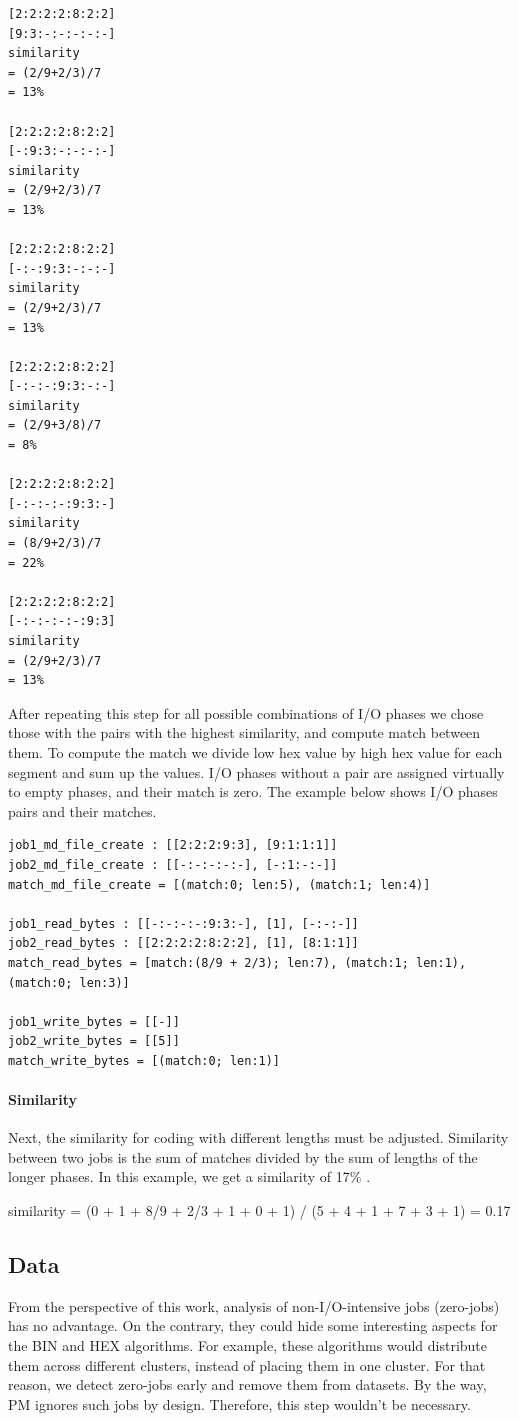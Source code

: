 \documentclass[]{llncs}
\begin{document}
\begin{lstlisting}
[2:2:2:2:8:2:2]
[9:3:-:-:-:-:-]
similarity 
= (2/9+2/3)/7 
= 13%

[2:2:2:2:8:2:2]
[-:9:3:-:-:-:-]
similarity 
= (2/9+2/3)/7 
= 13%

[2:2:2:2:8:2:2]
[-:-:9:3:-:-:-]
similarity 
= (2/9+2/3)/7 
= 13%

[2:2:2:2:8:2:2]
[-:-:-:9:3:-:-]
similarity 
= (2/9+3/8)/7
= 8%

[2:2:2:2:8:2:2]
[-:-:-:-:9:3:-]
similarity
= (8/9+2/3)/7
= 22%

[2:2:2:2:8:2:2]
[-:-:-:-:-:9:3]
similarity 
= (2/9+2/3)/7 
= 13%
\end{lstlisting}


After repeating this step for all possible combinations of I/O phases we chose those with the pairs with the highest similarity, and compute match between them.
To compute the match we divide low hex value by high hex value for each segment and sum up the values.
I/O phases without a pair are assigned virtually to empty phases, and their match is zero.
The example below shows I/O phases pairs and their matches.

\begin{lstlisting}
job1_md_file_create : [[2:2:2:9:3], [9:1:1:1]]
job2_md_file_create : [[-:-:-:-:-], [-:1:-:-]]
match_md_file_create = [(match:0; len:5), (match:1; len:4)]
 
job1_read_bytes : [[-:-:-:-:9:3:-], [1], [-:-:-]]
job2_read_bytes : [[2:2:2:2:8:2:2], [1], [8:1:1]]
match_read_bytes = [match:(8/9 + 2/3); len:7), (match:1; len:1), (match:0; len:3)]

job1_write_bytes = [[-]]
job2_write_bytes = [[5]]
match_write_bytes = [(match:0; len:1)]
\end{lstlisting}

\paragraph{Similarity}

Next, the similarity for coding with different lengths must be adjusted. Similarity between two jobs is the sum of matches divided by the sum of lengths of the longer phases. In this example, we get a similarity of 17$\%$ .

similarity = (0 + 1 + 8/9 + 2/3 + 1 + 0 + 1) / (5 + 4 + 1 + 7 + 3 + 1) = 0.17

\subsection{Data}
From the perspective of this work, analysis of non-I/O-intensive jobs (zero-jobs) has no advantage.
On the contrary, they could hide some interesting aspects for the BIN and HEX algorithms.
For example, these algorithms would distribute them across different clusters, instead of placing them in one cluster.
For that reason, we detect zero-jobs early and remove them from datasets.
By the way, PM ignores such jobs by design.
Therefore, this step wouldn’t be necessary.
\end{document}
